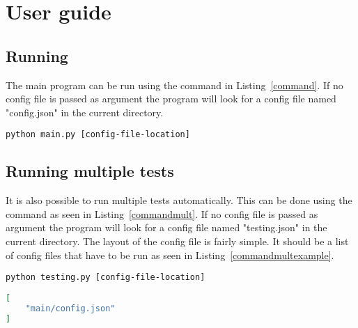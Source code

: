 
\chapter{User guide} %

\label{config} %

\section{Running}
The main program can be run using the command in Listing~\ref{command}. If no config file is passed as argument the program will look for a config file named "config.json" in the current directory. \\
\begin{lstlisting}[frame=single, label=command]
python main.py [config-file-location]
\end{lstlisting}

\section{Running multiple tests}
It is also possible to run multiple tests automatically. This can be done using the command as seen in Listing~\ref{commandmult}. If no config file is passed as argument the program will look for a config file named "testing.json" in the current directory. The layout of the config file is fairly simple. It should be a list of config files that have to be run as seen in Listing~\ref{commandmultexample}. \\

\begin{lstlisting}[frame=single, label=commandmult]
python testing.py [config-file-location]
\end{lstlisting}

\begin{lstlisting}[language=json,firstnumber=1, label=commandmultexample]
[
    "main/config.json"
]
\end{lstlisting}

